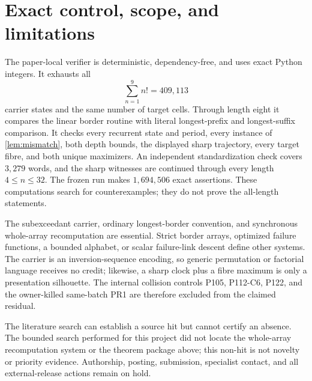 \documentclass[10pt,a4paper]{amsart}
\theoremstyle{definition}
\theoremstyle{remark}
\begin{document}
\section{Exact control, scope, and limitations}

The paper-local verifier is deterministic, dependency-free, and uses exact
Python integers.  It exhausts all
\[
                  \sum_{n=1}^{9}n!=409{,}113
\]
carrier states and the same number of target cells.  Through length eight it
compares the linear border routine with literal longest-prefix and
longest-suffix comparison.  It checks every recurrent state and period, every
instance of \cref{lem:mismatch}, both depth bounds, the displayed sharp
trajectory, every target fibre, and both unique maximizers.  An independent
standardization check covers $3{,}279$ words, and the sharp witnesses are
continued through every length $4\le n\le32$.  The frozen run makes
$1{,}694{,}506$ exact assertions.  These computations search for
counterexamples; they do not prove the all-length statements.

The subexceedant carrier, ordinary longest-border convention, and synchronous
whole-array recomputation are essential.  Strict border arrays, optimized
failure functions, a bounded alphabet, or scalar failure-link descent define
other systems.  The carrier is an inversion-sequence encoding, so generic
permutation or factorial language receives no credit; likewise, a sharp
clock plus a fibre maximum is only a presentation silhouette.  The internal
collision controls P105, P112-C6, P122, and the owner-killed same-batch PR1
are therefore excluded from the claimed residual.

The literature search can establish a source hit but cannot certify an
absence.  The bounded search performed for this project did not locate the
whole-array recomputation system or the theorem package above; this non-hit
is not novelty or priority evidence.  Authorship, posting, submission,
specialist contact, and all external-release actions remain on hold.



\end{document}
